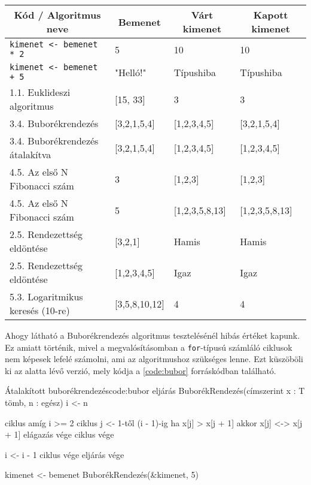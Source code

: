 \minipage[t]{\linewidth}\vspace{-14pt}
\begin{center}
    \begin{tabularx}{\textwidth}{ l l X X }
        \hline
        \multicolumn{1}{c}{\bfseries{Kód / Algoritmus neve}}  &
        \multicolumn{1}{c}{\bfseries{Bemenet}} &
        \multicolumn{1}{c}{\bfseries{Várt kimenet}} &
        \multicolumn{1}{c}{\bfseries{Kapott kimenet}}      \\

        \hline
        \texttt{kimenet <- bemenet * 2} & 5 & 10 & 10 \\
        \texttt{kimenet <- bemenet + 5} & "Helló!" & Típushiba & Típushiba \\
        1.1. Euklideszi algoritmus & [15, 33] & 3 & 3 \\
        3.4. Buborékrendezés & [3,2,1,5,4] & [1,2,3,4,5] & [3,2,1,5,4] \\
        3.4. Buborékrendezés átalakítva & [3,2,1,5,4] & [1,2,3,4,5] & [1,2,3,4,5] \\
        4.5. Az első N Fibonacci szám & 3 & [1,2,3] & [1,2,3] \\ 
        4.5. Az első N Fibonacci szám & 5 & [1,2,3,5,8,13] & [1,2,3,5,8,13] \\ 
        2.5. Rendezettség eldöntése & [3,2,1] & Hamis & Hamis \\
        2.5. Rendezettség eldöntése & [1,2,3,4,5] & Igaz & Igaz \\
        5.3. Logaritmikus keresés (10-re) & [3,5,8,10,12] & 4 & 4 \\
        \hline
    \end{tabularx}
\end{center}
\endminipage

Ahogy látható a Buborékrendezés algoritmus tesztelésénél hibás értéket kapunk. Ez amiatt történik, mivel a megvalósításomban a \texttt{for}-típusú számláló ciklusok nem képesek lefelé számolni, ami az algoritmushoz szükséges lenne. Ezt küszöböli ki az alatta lévő verzió, mely kódja a \ref{code:bubor} forráskódban található.

\begin{code}{Átalakított buborékrendezés}{code:bubor}
eljárás BuborékRendezés(címszerint x : T tömb, n : egész)
    i <- n

    ciklus amíg i >= 2
        ciklus j <- 1-től (i - 1)-ig
            ha x[j] > x[j + 1] akkor
                x[j] <-> x[j + 1]
            elágazás vége
        ciklus vége

        i <- i - 1
    ciklus vége
eljárás vége

kimenet <- bemenet
BuborékRendezés(&kimenet, 5)
\end{code}
